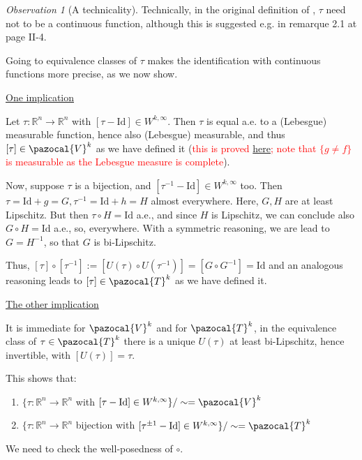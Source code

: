 \documentclass[english,a4paper,10pt,oneside]{scrbook}	%
\theoremstyle{break}
\theoremstyle{remark}
\newtheorem{obs}[equation]{Observation}
\newcommand{\mR}{\mathbb{R}}
\newcommand{\cV}{\pazocal{V}}
\newcommand{\cT}{\pazocal{T}}
\newcommand{\id}{\text{Id}}
\begin{document}
\begin{obs}[A technicality]

Technically, in the original definition of \cite{murat}, $\tau$ need not to be a continuous function, although this is suggested e.g. in remarque 2.1 at page II-4. 

Going to equivalence classes of $\tau$ makes the identification with continuous functions more precise, as we now show.

\underline{One implication}

Let $\tau: \mR^n\rightarrow\mR^n$ with $[\tau-\id] \in W^{k,\infty}$. Then $\tau$ is equal a.e. to a (Lebesgue) measurable function, hence also (Lebesgue) measurable, and thus $[\tau] \in \cV^k$ as we have defined it (\textcolor{red}{this is proved \href{https://heil.math.gatech.edu/6337/spring11/section3.4.pdf}{here}; note that $\{g\neq f\}$ is measurable as the Lebesgue measure is complete}).

Now, suppose $\tau$ is a bijection, and $[\tau^{-1}-\id] \in W^{k,\infty}$ too. Then $\tau = \id + g = G, \tau^{-1} = \id + h = H$ almost everywhere. Here, $G,H$ are at least Lipschitz.
But then $\tau \circ H = \id $ a.e., and since $H$ is Lipschitz, we can conclude also $G\circ H = \id$ a.e., so, everywhere. With a symmetric reasoning, we are lead to $G=H^{-1}$, so that $G$ is bi-Lipschitz.

Thus, $[\tau]\circ [\tau^{-1}]:=[U(\tau)\circ U(\tau^{-1})] = [G\circ G^{-1}] = \id$ and an analogous reasoning leads to $[\tau] \in \cT^k$ as we have defined it.

\underline{The other implication}

It is immediate for $\cV^k$ and for $\cT^k$, in the equivalence class of $\tau \in \cT^k$ there is a unique $U(\tau)$ at least bi-Lipschitz, hence invertible, with $[U(\tau)]=\tau$.

This shows that:

\begin{enumerate}
\item $\{\tau: \mR^n\rightarrow\mR^n$ with $[\tau-\id] \in W^{k,\infty}\} / \sim = \cV^k$
\item $\{\tau: \mR^n\rightarrow\mR^n$ bijection with $[\tau^{\pm 1}-\id] \in W^{k,\infty}\}/\sim = \cT^k$
\end{enumerate}

\end{obs}

We need to check the well-posedness of $\circ$.
\end{document}
